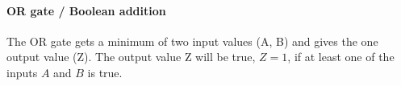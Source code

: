{}

\paragraph{OR gate / Boolean addition}
\begin{definition} The OR gate gets a minimum of two input values (A, B) and gives the one output value (Z). The output value Z will be true, $Z = 1$, if at least one of the inputs $A$ and $B$ is true. 
\end{definition}

